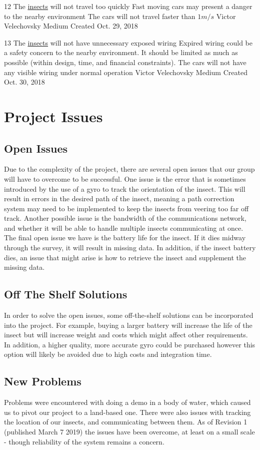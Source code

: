 \documentclass[11pt]{article}
\begin{document}
\nonFunctionalRequirement
{12}
{The \hyperref[sec:definitions]{insects} will not travel too quickly}
{Fast moving cars may present a danger to the nearby environment}
{The cars will not travel faster than $1 m/s$}
{Victor Velechovsky}
{Medium}
{Created Oct. 29, 2018}

\nonFunctionalRequirement
{13}
{The \hyperref[sec:definitions]{insects} will not have unnecessary exposed wiring}
{Expired wiring could be a safety concern to the nearby environment. It should
be limited as much as possible (within design, time, and financial constraints).}
{The cars will not have any visible wiring under normal operation}
{Victor Velechovsky}
{Medium}
{Created Oct. 30, 2018}

\section{Project Issues}
\subsection{Open Issues}
Due to the complexity of the project, there are several open issues that our group will have to overcome to be successful. 
One issue is the error that is sometimes introduced by the use of a gyro to track the orientation of the insect. This will result in errors in the desired path of the insect, meaning a path correction system may need to be implemented to keep the insects from veering too far off track.
Another possible issue is the bandwidth of the communications network, and whether it will be able to handle multiple insects communicating at once.
The final open issue we have is the battery life for the insect. If it dies midway through the survey, it will result in missing data. In addition, if the insect battery dies, an issue that might arise is how to retrieve the insect and supplement the missing data.
\subsection{Off The Shelf Solutions}
In order to solve the open issues, some off-the-shelf solutions can be incorporated into the project. For example, buying a larger battery will increase the life of the insect but will increase weight and costs which might affect other requirements. In addition, a higher quality, more accurate gyro could be purchased however this option will likely be avoided due to high costs and integration time.

\subsection{New Problems}
Problems were encountered with doing a demo in a body of water, which caused us
to pivot our project to a land-based one. There were also issues with
tracking the location of our insects, and communicating between them.
As of Revision 1 (published March 7 2019) the issues have been overcome, at
least on a small scale - though reliability of the system remains a concern.
\end{document}
